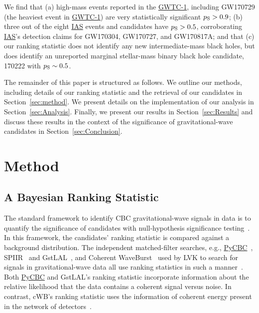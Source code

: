 \documentclass[%
 nofootinbib,
 amsmath,amssymb,
 aps,
 twocolumn,
 superscriptaddress
]{revtex4-2}
\newcommand{\gstlal}{{\sc GstLAL}\xspace}
\newcommand{\cwb}{{\sc cWB}\xspace}
\newcommand{\spiir}{{\sc SPIIR}\xspace}
\newcommand{\pycbc}{{\sc \href{https://pycbc.org/}{{PyCBC}}}\xspace}
\newcommand{\GWTC}{{\sc \href{https://ui.adsabs.harvard.edu/abs/2019PhRvX...9c1040A/abstract}{{GWTC-1}}}\xspace}
\newcommand{\IAS}{{\sc \href{https://ui.adsabs.harvard.edu/abs/2020PhRvD.101h3030V/abstract}{{IAS}}}\xspace}
\newcommand{\fancytext}[1]{{\relax\ifmmode#1\else $#1$\fi}\xspace}
\newcommand{\pastrobcr}{\fancytext{p_\text{S}}}
\newcommand{\avi}[1]{\textcolor{orange}{[AV: #1]}}
\begin{document}
We find that (a) high-mass events reported in the \GWTC, including GW170729 (the heaviest event in \GWTC) are very statistically significant $\pastrobcr>0.9$; (b) three out of the eight \IAS events and candidates have $\pastrobcr>0.5$, corroborating \IAS's detection claims for GW170304, GW170727, and GW170817A; and that (c) our ranking statistic does not identify any new intermediate-mass black holes, but does identify an unreported marginal stellar-mass binary black hole candidate, 170222 with $\pastrobcr\sim0.5$. %

The remainder of this paper is structured as follows. We outline our methods, including details of our ranking statistic and the retrieval of our candidates in Section~\ref{sec:method}. We present details on the implementation of our analysis in Section~\ref{sec:Analysis}. Finally, we present our results in Section~\ref{sec:Results} and discuss these results in the context of the significance of gravitational-wave candidates in Section~\ref{sec:Conclusion}.

\section{Method\label{sec:method}}
\subsection{A Bayesian Ranking Statistic}
The standard framework to identify CBC gravitational-wave signals in data is to quantify the significance of candidates with null-hypothesis significance testing~\cite{GWTC1, GWTC2}. In this framework, the candidates' ranking statistic is compared against a background distribution. The independent matched-filter searches, e.g., \pycbc~\cite{pycbc_og4}, \spiir~\cite{spiir} and \gstlal~\cite{sachdev2019gstlal}, and Coherent WaveBurst~\cite{cwb} used by LVK to search for signals in gravitational-wave data all use ranking statistics in such a manner~\cite{GWTC1}. Both \pycbc and \gstlal's ranking statistic incorporate information about the relative likelihood that the data contains a coherent signal versus noise. In contrast, \cwb's ranking statistic uses the information of coherent energy present in the network of detectors~\cite{GWTC1}. 
\end{document}
